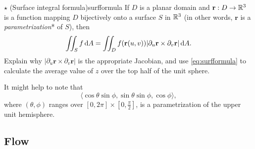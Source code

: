 \documentclass[svgnames]{watsonbook}
\begin{document}
\begin{exercise}{$\star$ (Surface integral formula)}{surfformula}
  If $D$ is a planar domain and $\mathbf{r}:D \to \mathbb{R}^3$ is a function
  mapping $D$ bijectively onto a surface $S$ in $\mathbb{R}^3$ (in other words,
  $\mathbf{r}$ is a \textit{parametrization}* of $S$), then
  \begin{equation} \label{eq:surfformula} 
    \iint_S f \, {\mathrm{d}}A = \iint_D f(\mathbf{r}(u,v)) |\partial_u
    \mathbf{r} \times \partial_v \mathbf{r}| \, {\mathrm{d}}A. 
  \end{equation}
  Explain why $|\partial_u
    \mathbf{r} \times \partial_v \mathbf{r}|$ is the appropriate
    Jacobian, and use \eqref{eq:surfformula} to calculate the average value of
    $z$ over the top half of the unit sphere.

    It might help to note that
    \[
      \langle \cos \theta \sin \phi, \sin \theta \sin \phi, \cos
      \phi
      \rangle, 
    \]
    where $(\theta,\phi)$ ranges over $[0,2\pi] \times
    [0,\tfrac{\pi}{2}]$, is a parametrization of the upper unit
    hemisphere. 
\end{exercise}

\subsection{Flow}

\end{document}
